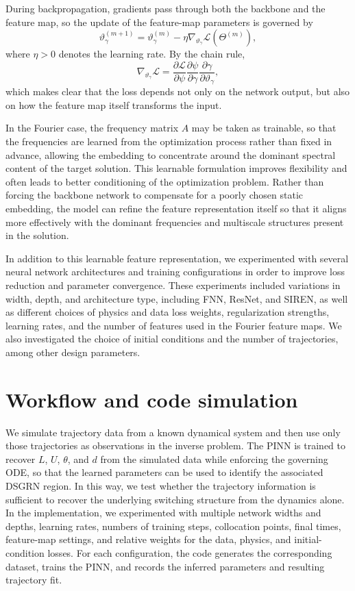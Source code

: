 \documentclass[11pt]{article}
\begin{document}
During backpropagation, gradients pass through both the backbone and the feature map, so the update of the feature-map parameters is governed by
\begin{equation}
\vartheta_{\gamma}^{(m+1)}
=
\vartheta_{\gamma}^{(m)}
-
\eta \nabla_{\vartheta_{\gamma}} \mathscr{L}(\Theta^{(m)}),
\end{equation}
where \(\eta>0\) denotes the learning rate. By the chain rule,
\[
\nabla_{\vartheta_{\gamma}} \mathscr{L}
=
\frac{\partial \mathscr{L}}{\partial \psi}
\frac{\partial \psi}{\partial \gamma}
\frac{\partial \gamma}{\partial \vartheta_{\gamma}},
\]
which makes clear that the loss depends not only on the network output, but also on how the feature map itself transforms the input.

In the Fourier case, the frequency matrix \(A\) may be taken as trainable, so that the frequencies are learned from the optimization process rather than fixed in advance, allowing the embedding to concentrate around the dominant spectral content of the target solution. This learnable formulation improves flexibility and often leads to better conditioning of the optimization problem. Rather than forcing the backbone network to compensate for a poorly chosen static embedding, the model can refine the feature representation itself so that it aligns more effectively with the dominant frequencies and multiscale structures present in the solution.

In addition to this learnable feature representation, we experimented with several neural network architectures and training configurations in order to improve loss reduction and parameter convergence. These experiments included variations in width, depth, and architecture type, including FNN, ResNet, and SIREN, as well as different choices of physics and data loss weights, regularization strengths, learning rates, and the number of features used in the Fourier feature maps. We also investigated the choice of initial conditions and the number of trajectories, among other design parameters.

\section{Workflow and code simulation}

We simulate trajectory data from a known dynamical system and then use only those trajectories as observations in the inverse problem. The PINN is trained to recover \(L\), \(U\), \(\theta\), and \(d\) from the simulated data while enforcing the governing ODE, so that the learned parameters can be used to identify the associated DSGRN region. In this way, we test whether the trajectory information is sufficient to recover the underlying switching structure from the dynamics alone. In the implementation, we experimented with multiple network widths and depths, learning rates, numbers of training steps, collocation points, final times, feature-map settings, and relative weights for the data, physics, and initial-condition losses. For each configuration, the code generates the corresponding dataset, trains the PINN, and records the inferred parameters and resulting trajectory fit.\\
\end{document}
